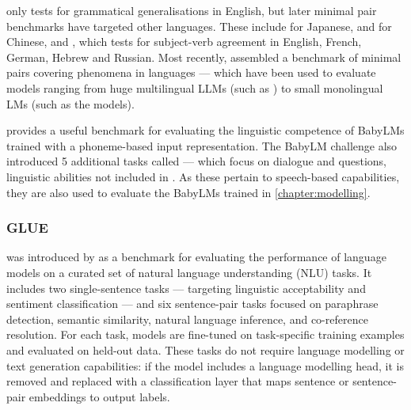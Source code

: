 \blimp only tests for grammatical generalisations in English, but later minimal pair benchmarks have targeted other languages. These include  \citep{someya-oseki-2023-jblimp} for Japanese,  \citep{xiang-etal-2021-climp} and  \citep{song-etal-2022-sling} for Chinese, and  \citep{mueller-etal-2020-cross}, which tests for subject-verb agreement in English, French, German, Hebrew and Russian. Most recently,  assembled a benchmark of minimal pairs covering  phenomena in  languages \citep{jumelet2025multiblimp10massivelymultilingual} --- which have been used to evaluate models ranging from huge multilingual LLMs (such as \llamathree) to small monolingual LMs (such as the  models).%

\blimp provides a useful benchmark for evaluating the linguistic competence of BabyLMs trained with a phoneme-based input representation. The BabyLM challenge also introduced 5 additional \blimp tasks called \blimpsupp --- which focus on dialogue and questions, linguistic abilities not included in \blimp \citep{warstadt-2023-babylm-findings}. As these pertain to speech-based capabilities, they are also used to evaluate the BabyLMs trained in \cref{chapter:modelling}.  


\subsubsection{GLUE}\label{sec:12-glue}

\glue was introduced by \citet{wang-etal-2018-glue} as a benchmark for evaluating the performance of language models on a curated set of natural language understanding (NLU) tasks. It includes two single-sentence tasks --- targeting linguistic acceptability and sentiment classification --- and six sentence-pair tasks focused on paraphrase detection, semantic similarity, natural language inference, and co-reference resolution. For each task, models are fine-tuned on task-specific training examples and evaluated on held-out data. These tasks do not require language modelling or text generation capabilities: if the model includes a language modelling head, it is removed and replaced with a classification layer that maps sentence or sentence-pair embeddings to output labels.

